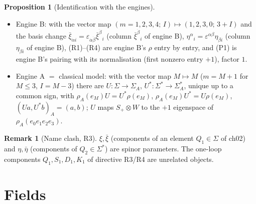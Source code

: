 \documentclass[11pt]{article}
\theoremstyle{definition}
\newtheorem{proposition}[definition]{Proposition}
\newtheorem{remark}[definition]{Remark}
\begin{document}
\begin{proposition}[Identification with the engines]\label{prop:engines}\leavevmode
\begin{itemize}
\item Engine B: with the vector map $(m=1,2,3,4;\,I)\mapsto(1,2,3,0;\,3+I)$ and the basis change $\bar\xi_{\dot\alpha i}=\varepsilon_{\dot\alpha\dot\beta}\bar\xi^{\dot\beta}{}_i$ (column $\bar\xi^{\dot\beta}{}_i$ of engine B), $\eta^\alpha{}_i=\varepsilon^{\alpha\beta}\eta_{\beta i}$ (column $\eta_{\beta i}$ of engine B), (R1)--(R4) are engine B's $\rho$ entry by entry, and (P1) is engine B's pairing with its normalisation (first nonzero entry $+1$), factor $1$.
\item Engine A $=$ classical model: with the vector map $M\mapsto M$ ($m=M+1$ for $M\le3$, $I=M-3$) there are $U\colon\Sigma\to\Sigma_A$, $U^*\colon\Sigma^*\to\Sigma^*_A$, unique up to a common sign, with $\rho_A(e_M)U=U^*\rho(e_M)$, $\rho_A(e_M)U^*=U\rho(e_M)$, $(Ua,U^*b)_A=(a,b)$; $U$ maps $S_+\otimes W$ to the $+1$ eigenspace of $\rho_A(e_0e_1e_2e_3)$.
\end{itemize}
\end{proposition}

\begin{remark}[Name clash, R3]
$\xi,\bar\xi$ (components of an element $Q_1\in\Sigma$ of ch02) and $\eta,\bar\eta$ (components of $Q_2\in\Sigma^*$) are spinor parameters. The one-loop components $Q_1,S_1,D_1,K_1$ of directive R3/R4 are unrelated objects.
\end{remark}

\section{Fields}
\end{document}
